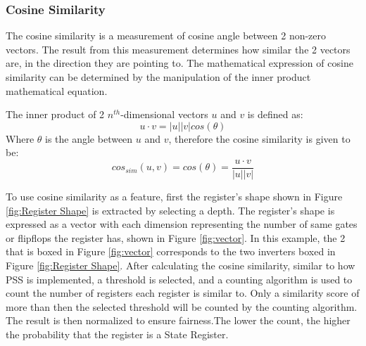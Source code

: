 \documentclass{tum-book}
\begin{document}
        \bigskip\subsubsection{Cosine Similarity}\label{subsubsection:cosine similarity}
        The cosine similarity is a measurement of cosine angle between 2 non-zero vectors. The result from this measurement determines how similar the 2 vectors are, in the direction they are pointing to. The mathematical expression of cosine similarity can be determined by the manipulation of the inner product mathematical equation.

            \bigskip\noindent The inner product of 2 $n^{th}$-dimensional vectors $u$ and $v$ is defined as:
            \begin{equation}
                \label{eqn:dot product}
                u\cdot v = |u||v|cos(\theta)
            \end{equation}
            \noindent 
            Where $\theta$ is the angle between $u$ and $v$, therefore the cosine similarity is given to be:
            \begin{equation}
                \label{eqn:cosine similarity}
                cos_{sim}(u,v)=cos(\theta)=\frac{u\cdot v}{|u||v|} 
            \end{equation}
            
            \noindent 
            To use cosine similarity as a feature, first the register's shape shown in Figure \ref{fig:Register Shape} is extracted by selecting a depth. The register's shape is expressed as a vector with each dimension representing the number of same gates or flipflops the register has, shown in Figure \ref{fig:vector}. In this example, the 2 that is boxed in Figure \ref{fig:vector} corresponds to the two inverters boxed in Figure \ref{fig:Register Shape}. After calculating the cosine similarity, similar to how PSS is implemented, a threshold is selected, and a counting algorithm is used to count the number of registers each register is similar to. Only a similarity score of more than then the selected threshold will be counted by the counting algorithm. The result is then normalized to ensure fairness.The lower the count, the higher the probability that the register is a State Register. 
            
\end{document}
